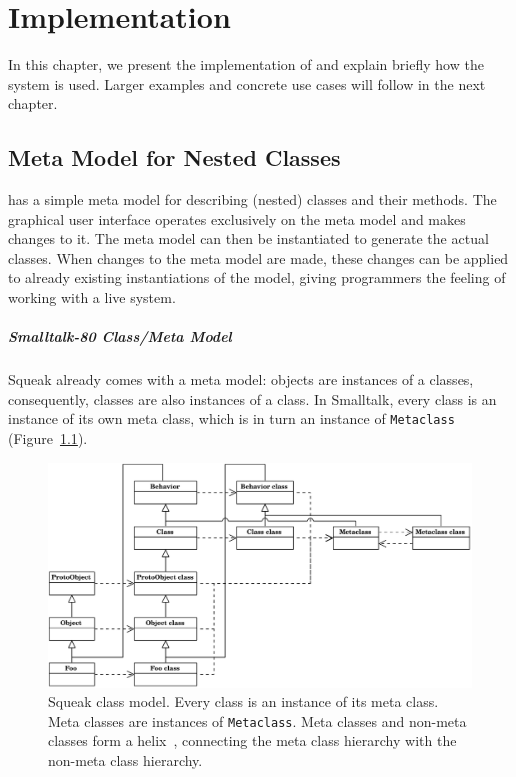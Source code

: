 \chapter{Implementation}
\label{sec:impl}
In this chapter, we present the implementation of \msname and explain briefly how the system is used. Larger examples and concrete use cases will follow in the next chapter.

\section{Meta Model for Nested Classes}
\label{sec:impl_meta_model}
\msname has a simple meta model for describing (nested) classes and their methods. The graphical user interface operates exclusively on the meta model and makes changes to it. The meta model can then be instantiated to generate the actual classes. When changes to the meta model are made, these changes can be applied to already existing instantiations of the model, giving programmers the feeling of working with a live system.

\paragraph{Smalltalk-80 Class/Meta Model}
Squeak already comes with a meta model: objects are instances of a classes, consequently, classes are also instances of a class. In Smalltalk, every class is an instance of its own meta class, which is in turn an instance of \texttt{Metaclass} (Figure~\ref{fig:impl_squeak_meta}).

\begin{figure}
	\includegraphics[width=\textwidth]{squeak_meta.pdf}
	\centering
	\caption[Squeak class model]{Squeak class model. Every class is an instance of its meta class. Meta classes are instances of \texttt{Metaclass}. Meta classes and non-meta classes form a helix~\cite{Briot:1989:PEM:74877.74921}, connecting the meta class hierarchy with the non-meta class hierarchy.}
	\label{fig:impl_squeak_meta}
\end{figure}

